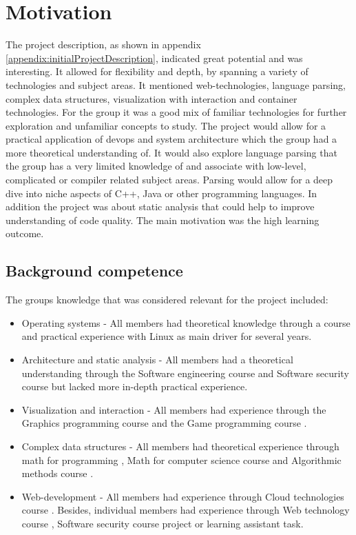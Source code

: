 \section{Motivation}
%
%
The project description, as shown in appendix \ref{appendix:initialProjectDescription}, indicated great potential and was interesting. It allowed for flexibility and depth, by spanning a variety of technologies and subject areas. It mentioned web-technologies, language parsing, complex data structures, visualization with interaction and container technologies. For the group it was a good mix of familiar technologies for further exploration and unfamiliar concepts to study. The project would allow for a practical application of \gls{devops} and system architecture which the group had a more theoretical understanding of. It would also explore language parsing that the group has a very limited knowledge of and associate with low-level, complicated or compiler related subject areas. Parsing would allow for a deep dive into niche aspects of C++, Java or other programming languages. In addition the project was about static analysis that could help to improve understanding of code quality. The main motivation was the high learning outcome.

\subsection{Background competence}
\label{sec:competence}

The groups knowledge that was considered relevant for the project included:
\begin{itemize}
    \item Operating systems - All members had theoretical knowledge through a course \cite{course:operating} and practical experience with Linux as main driver for several years.
    \item Architecture and static analysis - All members had a theoretical understanding through the Software engineering course \cite{course:softEng} and Software security course but lacked more in-depth practical experience.
    \item Visualization and interaction - All members had experience through the Graphics programming course \cite{course:graphics} and the Game programming course \cite{course:gameprog}. 
    \item Complex data structures - All members had theoretical experience through math for programming \cite{course:progMath}, Math for computer science course \cite{course:mathComputerScience} and Algorithmic methods course \cite{course:algmet}.
    \item Web-development - All members had experience through Cloud technologies course \cite{course:cloud}. Besides, individual members had experience through Web technology course \cite{course:webtech}, Software security course \cite{course:softSec} project or learning assistant task. 
\end{itemize}
